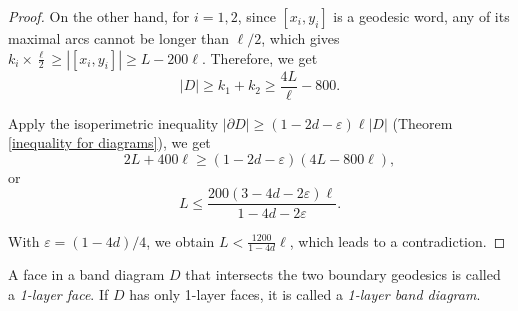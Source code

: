 \documentclass[a4paper]{article}
\theoremstyle{remark}
\begin{document}
\begin{proof}
    On the other hand, for $i=1,2$, since $[x_i,y_i]$ is a geodesic word, any of its maximal arcs cannot be longer than $\ell/2$, which gives $k_i\times\frac{\ell}{2}\geq |[x_i,y_i]|\geq L-200\ell$. Therefore, we get \[|D|\geq k_1+k_2\geq \frac{4L}{\ell}-800.\]

    Apply the isoperimetric inequality $|\partial D| \geq (1-2d-\varepsilon)\ell|D|$ (Theorem \ref{inequality for diagrams}), we get
    \[2L+400\ell \geq (1-2d-\varepsilon)(4L-800\ell),\]
    or
    \[L\leq \frac{200(3-4d-2\varepsilon)\ell}{1-4d-2\varepsilon}.\]   
    
    With $\varepsilon = (1-4d)/4$, we obtain $L<\frac{1200}{1-4d}\ell$, which leads to a contradiction.

\end{proof}

\quad

A face in a band diagram $D$ that intersects the two boundary geodesics is called a \textit{1-layer face}. If $D$ has only 1-layer faces, it is called a \textit{1-layer band diagram}.
\end{document}
